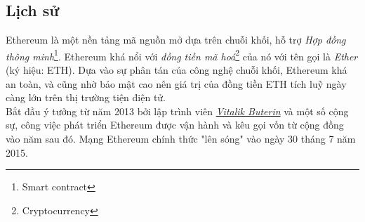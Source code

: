\subsection{Lịch sử}

Ethereum là một nền tảng mã nguồn mở dựa trên chuỗi khối, hỗ trợ \textit{Hợp đồng thông minh}\footnote{Smart contract}. Ethereum khá nổi với \textit{đồng tiền mã hoá}\footnote{Cryptocurrency} của nó với tên gọi là \textit{Ether} (ký hiệu: ETH). Dựa vào sự phân tán của công nghệ chuỗi khối, Ethereum khá an toàn, và cũng nhờ bảo mật cao nên giá trị của đồng tiền ETH tích luỹ ngày càng lớn trên thị trường tiện điện tử.\\

Bắt đầu ý tưởng từ năm 2013 bởi lập trình viên \href{https://en.wikipedia.org/wiki/Vitalik_Buterin}{\textit{Vitalik Buterin}} và một số cộng sự, công việc phát triển Ethereum được vận hành và kêu gọi vốn từ cộng đồng vào năm sau đó. Mạng Ethereum chính thức "lên sóng" vào ngày 30 tháng 7 năm 2015.\\




